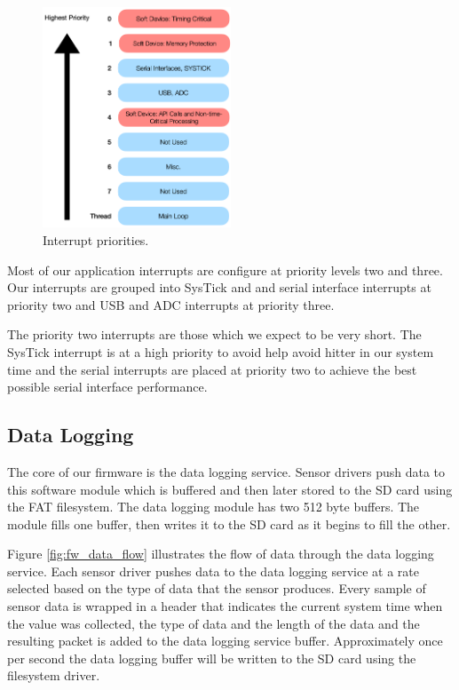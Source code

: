 \begin{figure}[!htb]
\centering
\includegraphics[width=0.5\textwidth]{images/fw_int_prio.png}
\caption{Interrupt priorities.}
\label{fig:fw_int_prio}
\end{figure}

Most of our application interrupts are configure at priority levels two and
three. Our interrupts are grouped into SysTick and and serial interface
interrupts at priority two and USB and ADC interrupts at priority three.

The priority two interrupts are those which we expect to be very short. The
SysTick interrupt is at a high priority to avoid help avoid hitter in our system
time and the serial interrupts are placed at priority two to achieve the best
possible serial interface performance.

\subsection{Data Logging}

The core of our firmware is the data logging service. Sensor drivers push data
to this software module which is buffered and then later stored to the SD card
using the FAT filesystem. The data logging module has two 512 byte buffers. The
module fills one buffer, then writes it to the SD card as it begins to fill the
other.

Figure \ref{fig:fw_data_flow} illustrates the flow of data through the data
logging service. Each sensor driver pushes data to the data logging service at a
rate selected based on the type of data that the sensor produces. Every sample
of sensor data is wrapped in a header that indicates the current system time
when the value was collected, the type of data and the length of the data and
the resulting packet is added to the data logging service buffer. Approximately
once per second the data logging buffer will be written to the SD card using the
filesystem driver.

